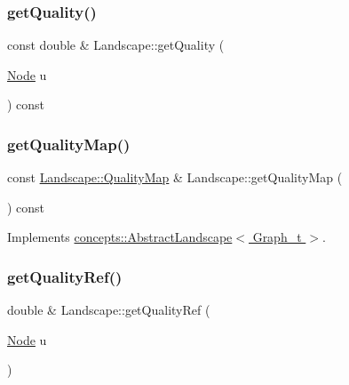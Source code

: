 \mbox{\label{class_landscape_a15c6c9bf708e4ceb3a9118157f99659a}} 
\subsubsection{\texorpdfstring{get\+Quality()}{getQuality()}}
{\footnotesize\ttfamily const double \& Landscape\+::get\+Quality (\begin{DoxyParamCaption}\item[{\hyperlink{classconcepts_1_1_abstract_landscape_a7c2f90fb9f42302f1af84a59f4df4b91}{Node}}]{u }\end{DoxyParamCaption}) const}

\mbox{\label{class_landscape_a77f947fdc6a8c8875d7d383eb5ce7817}} 
\subsubsection{\texorpdfstring{get\+Quality\+Map()}{getQualityMap()}}
{\footnotesize\ttfamily const \hyperlink{classconcepts_1_1_abstract_landscape_aab540b896ac9b7a7a5783f2a78f304ad}{Landscape\+::\+Quality\+Map} \& Landscape\+::get\+Quality\+Map (\begin{DoxyParamCaption}{ }\end{DoxyParamCaption}) const\hspace{0.3cm}{\ttfamily [virtual]}}



Implements \hyperlink{classconcepts_1_1_abstract_landscape_ab0ff4aa5ac8d95d9207e32582e3e95f2}{concepts\+::\+Abstract\+Landscape$<$ Graph\+\_\+t $>$}.

\mbox{\label{class_landscape_af6fdabb5a81dc4cf75d7baaf6d98ee31}} 
\subsubsection{\texorpdfstring{get\+Quality\+Ref()}{getQualityRef()}}
{\footnotesize\ttfamily double \& Landscape\+::get\+Quality\+Ref (\begin{DoxyParamCaption}\item[{\hyperlink{classconcepts_1_1_abstract_landscape_a7c2f90fb9f42302f1af84a59f4df4b91}{Node}}]{u }\end{DoxyParamCaption})}

